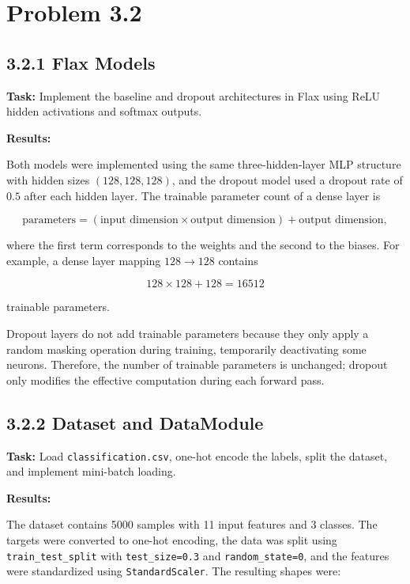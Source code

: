 \documentclass{article}
\begin{document}
\section*{Problem 3.2}

\subsection*{3.2.1 Flax Models}

\textbf{Task:} Implement the baseline and dropout architectures in Flax using ReLU hidden activations and softmax outputs.

\vspace{0.3cm}

\textbf{Results:}

Both models were implemented using the same three-hidden-layer MLP structure with hidden sizes \((128,128,128)\), and the dropout model used a dropout rate of \(0.5\) after each hidden layer. The trainable parameter count of a dense layer is

\[
\text{parameters} = (\text{input dimension} \times \text{output dimension}) + \text{output dimension},
\]

where the first term corresponds to the weights and the second to the biases. For example, a dense layer mapping \(128 \rightarrow 128\) contains

\[
128 \times 128 + 128 = 16512
\]

trainable parameters.

Dropout layers do not add trainable parameters because they only apply a random masking operation during training, temporarily deactivating some neurons. Therefore, the number of trainable parameters is unchanged; dropout only modifies the effective computation during each forward pass.


\subsection*{3.2.2 Dataset and DataModule}

\textbf{Task:} Load \texttt{classification.csv}, one-hot encode the labels, split the dataset, and implement mini-batch loading.

\vspace{0.3cm}

\textbf{Results:}

The dataset contains 5000 samples with 11 input features and 3 classes. The targets were converted to one-hot encoding, the data was split using \texttt{train\_test\_split} with \texttt{test\_size=0.3} and \texttt{random\_state=0}, and the features were standardized using \texttt{StandardScaler}. The resulting shapes were:
\end{document}
